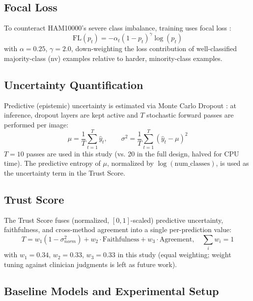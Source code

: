\documentclass[conference]{IEEEtran}
\begin{document}
\subsection{Focal Loss}

To counteract HAM10000's severe class imbalance, training uses focal loss \cite{lin2017}:
\begin{equation}
\mathrm{FL}(p_t) = -\alpha_t (1-p_t)^\gamma \log(p_t)
\end{equation}
with $\alpha=0.25$, $\gamma=2.0$, down-weighting the loss contribution of well-classified
majority-class (nv) examples relative to harder, minority-class examples.

\subsection{Uncertainty Quantification}

Predictive (epistemic) uncertainty is estimated via Monte Carlo Dropout \cite{gal2016}: at
inference, dropout layers are kept active and $T$ stochastic forward passes are performed
per image:
\begin{equation}
\mu = \frac{1}{T}\sum_{t=1}^{T} \hat{y}_t, \qquad
\sigma^2 = \frac{1}{T}\sum_{t=1}^{T} (\hat{y}_t - \mu)^2
\end{equation}
$T=10$ passes are used in this study (vs. 20 in the full design, halved for CPU time). The
predictive entropy of $\mu$, normalized by $\log(\text{num\_classes})$, is used as the
uncertainty term in the Trust Score.

\subsection{Trust Score}

The Trust Score fuses (normalized, $[0,1]$-scaled) predictive uncertainty, faithfulness,
and cross-method agreement into a single per-prediction value:
\begin{equation}
T = w_1(1-\sigma^2_{norm}) + w_2 \cdot \mathrm{Faithfulness} + w_3 \cdot \mathrm{Agreement},
\quad \textstyle\sum_i w_i = 1
\end{equation}
with $w_1=0.34$, $w_2=0.33$, $w_3=0.33$ in this study (equal weighting; weight tuning
against clinician judgments is left as future work).

\subsection{Baseline Models and Experimental Setup}
\label{sec:setup}
\end{document}
